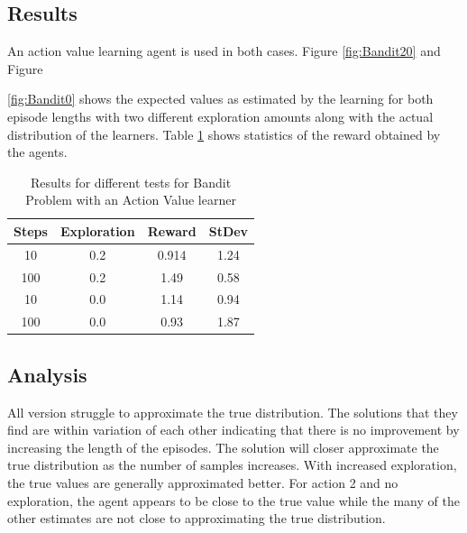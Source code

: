 \subsection{Results}
An action value learning agent is used in both cases.  Figure \ref{fig:Bandit20} and Figure {\ref{fig:Bandit0} shows the expected values as estimated by the learning for both episode lengths with two different exploration amounts along with the actual distribution of the learners.  Table \ref{tab:Bandit} shows statistics of the reward obtained by the agents.

\begin{table}[]
\centering
\begin{tabular}{|c|c|c|c|}
\hline
Steps & Exploration & Reward & StDev \\ \hline
10    & 0.2         & 0.914  & 1.24  \\ \hline
100   & 0.2         & 1.49   & 0.58  \\ \hline
10    & 0.0         & 1.14   & 0.94  \\ \hline
100   & 0.0         & 0.93   & 1.87  \\ \hline
\end{tabular}
\caption{Results for different tests for Bandit Problem with an Action Value learner}
\label{tab:Bandit}
\end{table}

\subsection{Analysis}
All version struggle to approximate the true distribution.  The solutions that they find are within variation of each other indicating that there is no improvement by increasing the length of the episodes. The solution will closer approximate the true distribution as the number of samples increases.  With increased exploration, the true values are generally approximated better.  For action 2 and no exploration, the agent appears to be close to the true value while the many of the other estimates are not close to approximating the true distribution.  

}
